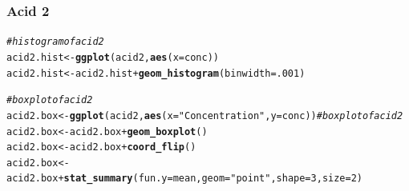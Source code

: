 \documentclass{article}\usepackage[]{graphicx}\usepackage[]{color}
\makeatletter
\newcommand{\hlnum}[1]{\textcolor[rgb]{0.686,0.059,0.569}{#1}}%
\newcommand{\hlstr}[1]{\textcolor[rgb]{0.192,0.494,0.8}{#1}}%
\newcommand{\hlcom}[1]{\textcolor[rgb]{0.678,0.584,0.686}{\textit{#1}}}%
\newcommand{\hlopt}[1]{\textcolor[rgb]{0,0,0}{#1}}%
\newcommand{\hlstd}[1]{\textcolor[rgb]{0.345,0.345,0.345}{#1}}%
\newcommand{\hlkwb}[1]{\textcolor[rgb]{0.69,0.353,0.396}{#1}}%
\newcommand{\hlkwc}[1]{\textcolor[rgb]{0.333,0.667,0.333}{#1}}%
\newcommand{\hlkwd}[1]{\textcolor[rgb]{0.737,0.353,0.396}{\textbf{#1}}}%
\newenvironment{kframe}{%
 \def\at@end@of@kframe{}%
 \ifinner\ifhmode%
  \def\at@end@of@kframe{\end{minipage}}%
  \begin{minipage}{\columnwidth}%
 \fi\fi%
 \def\FrameCommand##1{\hskip\@totalleftmargin \hskip-\fboxsep
 \colorbox{shadecolor}{##1}\hskip-\fboxsep
     \hskip-\linewidth \hskip-\@totalleftmargin \hskip\columnwidth}%
 \MakeFramed {\advance\hsize-\width
   \@totalleftmargin\z@ \linewidth\hsize
   \@setminipage}}%
 {\par\unskip\endMakeFramed%
 \at@end@of@kframe}
\newenvironment{knitrout}{}{} %
\makeatother
\begin{document}
\subsubsection{Acid 2}


\begin{knitrout}
\color{fgcolor}\begin{kframe}
\begin{alltt}
\hlcom{# histogram of acid2}
\hlstd{acid2.hist} \hlkwb{<-} \hlkwd{ggplot}\hlstd{(acid2,} \hlkwd{aes}\hlstd{(}\hlkwc{x} \hlstd{= conc))}
\hlstd{acid2.hist} \hlkwb{<-} \hlstd{acid2.hist} \hlopt{+} \hlkwd{geom_histogram}\hlstd{(}\hlkwc{binwidth} \hlstd{=} \hlnum{.001}\hlstd{)}

\hlcom{# boxplot of acid2}
\hlstd{acid2.box} \hlkwb{<-} \hlkwd{ggplot}\hlstd{(acid2,} \hlkwd{aes}\hlstd{(}\hlkwc{x} \hlstd{=} \hlstr{"Concentration"}\hlstd{,} \hlkwc{y} \hlstd{= conc))} \hlcom{# boxplot of acid2}
\hlstd{acid2.box} \hlkwb{<-} \hlstd{acid2.box} \hlopt{+} \hlkwd{geom_boxplot}\hlstd{()}
\hlstd{acid2.box} \hlkwb{<-} \hlstd{acid2.box} \hlopt{+} \hlkwd{coord_flip}\hlstd{()}
\hlstd{acid2.box} \hlkwb{<-} \hlstd{acid2.box} \hlopt{+} \hlkwd{stat_summary}\hlstd{(}\hlkwc{fun.y} \hlstd{= mean,} \hlkwc{geom} \hlstd{=} \hlstr{"point"}\hlstd{,} \hlkwc{shape} \hlstd{=} \hlnum{3}\hlstd{,} \hlkwc{size} \hlstd{=} \hlnum{2}\hlstd{)}
\end{alltt}
\end{kframe}
\end{knitrout}
\end{document}
